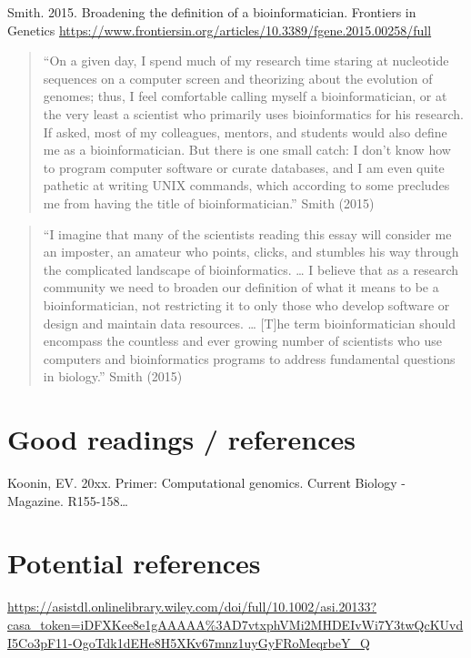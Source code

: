 \documentclass[
]{book}
\begin{document}
Smith. 2015. Broadening the definition of a bioinformatician. Frontiers in Genetics
\url{https://www.frontiersin.org/articles/10.3389/fgene.2015.00258/full}

\begin{quote}
``On a given day, I spend much of my research time staring at nucleotide sequences on a computer screen and theorizing about the evolution of genomes; thus, I feel comfortable calling myself a bioinformatician, or at the very least a scientist who primarily uses bioinformatics for his research. If asked, most of my colleagues, mentors, and students would also define me as a bioinformatician. But there is one small catch: I don't know how to program computer software or curate databases, and I am even quite pathetic at writing UNIX commands, which according to some precludes me from having the title of bioinformatician.'' Smith (2015)
\end{quote}

\begin{quote}
``I imagine that many of the scientists reading this essay will consider me an imposter, an amateur who points, clicks, and stumbles his way through the complicated landscape of bioinformatics. \ldots{} I believe that as a research community we need to broaden our definition of what it means to be a bioinformatician, not restricting it to only those who develop software or design and maintain data resources. \ldots{} {[}T{]}he term bioinformatician should encompass the countless and ever growing number of scientists who use computers and bioinformatics programs to address fundamental questions in biology.'' Smith (2015)
\end{quote}

\hypertarget{good-readings-references}{%
\section{Good readings / references}\label{good-readings-references}}

Koonin, EV. 20xx. Primer: Computational genomics. Current Biology - Magazine. R155-158\ldots{}

\hypertarget{potential-references}{%
\section{Potential references}\label{potential-references}}

\url{https://asistdl.onlinelibrary.wiley.com/doi/full/10.1002/asi.20133?casa_token=iDFXKee8e1gAAAAA\%3AD7vtxphVMi2MHDEIvWi7Y3twQcKUvdI5Co3pF11-OgoTdk1dEHe8H5XKv67mnz1uyGyFRoMeqrbeY_Q}
\end{document}
